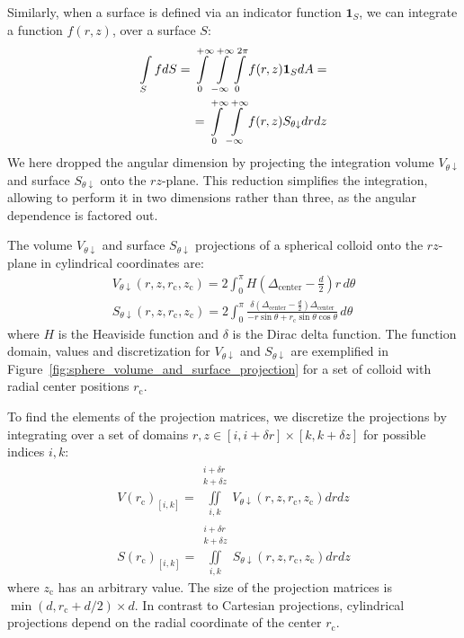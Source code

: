 \documentclass[10pt, a4paper]{article}
\begin{document}
\begin{multicols}{2}
Similarly, when a surface is defined via an indicator function $\bm{1}_S$, we can integrate a function $f(r, z)$, over a surface $S$:
\begin{eqnarray}
    \label{eq:int_indicator_S}
    \begin{split}
        \int\limits_{S} f dS = \int\displaylimits_{0}^{+\infty} \int\displaylimits_{-\infty}^{+\infty} \int\displaylimits_{0}^{2\pi} f(r, z) \bm{1}_S  dA =\\
        =\int\displaylimits_{0}^{+\infty} \int\displaylimits_{-\infty}^{+\infty} f(r, z)  S_{\theta \downarrow} dr dz
    \end{split}
\end{eqnarray}
We here dropped the angular dimension by projecting the integration volume $V_{\theta \downarrow}$ and surface $S_{\theta \downarrow}$ onto the $rz$-plane.
This reduction simplifies the integration, allowing to perform it in two dimensions rather than three, as the angular dependence is factored out.

The volume $V_{\theta \downarrow}$ and surface $S_{\theta \downarrow}$ projections of a spherical colloid onto the $rz$-plane in cylindrical coordinates are:
\begin{gather}
    V_{\theta \downarrow}(r, z, r_{\text{c}}, z_{\text{c}}) = 2\int_{0}^{\pi} H\left( \Delta_{\text{center}} - \frac{d}{2} \right) r \, d\theta
    \\
    S_{\theta \downarrow}(r, z, r_{\text{c}}, z_{\text{c}}) = 2\int_{0}^{\pi} \frac{\delta \left( \Delta_{\text{center}} - \frac{d}{2} \right) \Delta_{\text{center}}}{-r \sin \theta + r_{\text{c}} \sin \theta \cos \theta} \, d\theta
\end{gather}
where $H$ is the Heaviside function and $\delta$ is the Dirac delta function.
The function domain, values and discretization for $V_{\theta \downarrow}$ and $S_{\theta \downarrow}$ are exemplified in Figure~\ref{fig:sphere_volume_and_surface_projection} for a set of colloid with radial center positions $r_{\text{c}}$.

To find the elements of the projection matrices, we discretize the projections by integrating over a set of domains $r, z \in [i, i + \delta r] \times [k, k + \delta z]$ for possible indices $i,k$:
\begin{eqnarray}
    V(r_{\text{c}})_{[i, k]} = \iint \limits_{i, k}^{\substack{i+\delta r\\ k+\delta z}} V_{\theta \downarrow} (r, z, r_{\text{c}}, z_{\text{c}}) dr dz
    \\
    S(r_{\text{c}})_{[i, k]} = \iint \limits_{i, k}^{\substack{i+\delta r\\ k+\delta z}} S_{\theta \downarrow} (r, z, r_{\text{c}}, z_{\text{c}}) dr dz
\end{eqnarray}
where $z_{\text{c}}$ has an arbitrary value.
The size of the projection matrices is $\min(d, r_{\text{c}} + d/2) \times d$.
In contrast to Cartesian projections, cylindrical projections depend on the radial coordinate of the center $r_{\text{c}}$.


\end{multicols}
\end{document}
